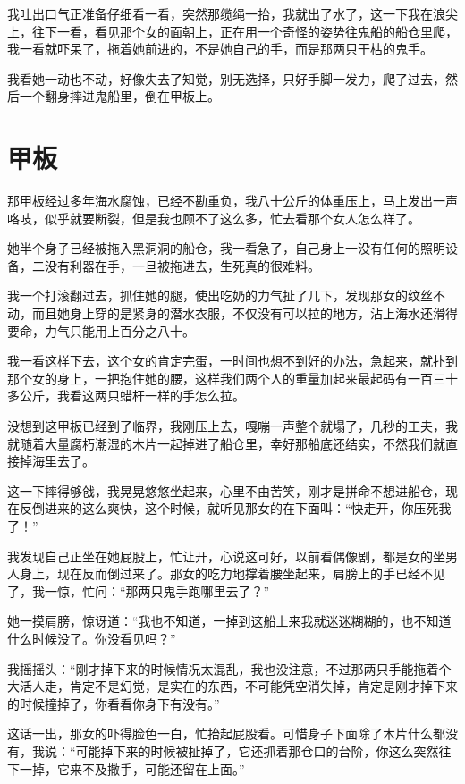 我吐出口气正准备仔细看一看，突然那缆绳一抬，我就出了水了，这一下我在浪尖上，往下一看，看见那个女的面朝上，正在用一个奇怪的姿势往鬼船的船仓里爬，我一看就吓呆了，拖着她前进的，不是她自己的手，而是那两只干枯的鬼手。

我看她一动也不动，好像失去了知觉，别无选择，只好手脚一发力，爬了过去，然后一个翻身摔进鬼船里，倒在甲板上。

\chapter{甲板}

那甲板经过多年海水腐蚀，已经不勘重负，我八十公斤的体重压上，马上发出一声咯吱，似乎就要断裂，但是我也顾不了这么多，忙去看那个女人怎么样了。

她半个身子已经被拖入黑洞洞的船仓，我一看急了，自己身上一没有任何的照明设备，二没有利器在手，一旦被拖进去，生死真的很难料。

我一个打滚翻过去，抓住她的腿，使出吃奶的力气扯了几下，发现那女的纹丝不动，而且她身上穿的是紧身的潜水衣服，不仅没有可以拉的地方，沾上海水还滑得要命，力气只能用上百分之八十。

我一看这样下去，这个女的肯定完蛋，一时间也想不到好的办法，急起来，就扑到那个女的身上，一把抱住她的腰，这样我们两个人的重量加起来最起码有一百三十多公斤，我看这两只蜡杆一样的手怎么拉。

没想到这甲板已经到了临界，我刚压上去，嘎嘣一声整个就塌了，几秒的工夫，我就随着大量腐朽潮湿的木片一起掉进了船仓里，幸好那船底还结实，不然我们就直接掉海里去了。

这一下摔得够戗，我晃晃悠悠坐起来，心里不由苦笑，刚才是拼命不想进船仓，现在反倒进来的这么爽快，这个时候，就听见那女的在下面叫：“快走开，你压死我了！”

我发现自己正坐在她屁股上，忙让开，心说这可好，以前看偶像剧，都是女的坐男人身上，现在反而倒过来了。那女的吃力地撑着腰坐起来，肩膀上的手已经不见了，我一惊，忙问：“那两只鬼手跑哪里去了？”

她一摸肩膀，惊讶道：“我也不知道，一掉到这船上来我就迷迷糊糊的，也不知道什么时候没了。你没看见吗？”

我摇摇头：“刚才掉下来的时候情况太混乱，我也没注意，不过那两只手能拖着个大活人走，肯定不是幻觉，是实在的东西，不可能凭空消失掉，肯定是刚才掉下来的时候撞掉了，你看看你身下有没有。”

这话一出，那女的吓得脸色一白，忙抬起屁股看。可惜身子下面除了木片什么都没有，我说：“可能掉下来的时候被扯掉了，它还抓着那仓口的台阶，你这么突然往下一掉，它来不及撒手，可能还留在上面。”

